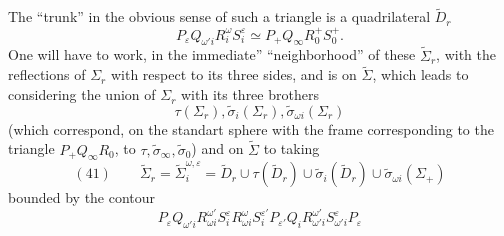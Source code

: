 The ``trunk''  in the obvious sense of such a triangle is a quadrilateral $\widetilde D_r$
\[
P_\varepsilon Q_{\omega'i}R_i^\omega S_i^\varepsilon\simeq P_+Q_\infty R_0^+S_0^+.
\]
One will have to work, in the immediate'' ``neighborhood'' of these    $\widetilde\Sigma_r$, with the reflections of $\Sigma_r$ with respect to its three sides, and is on $\widetilde\Sigma$,  which leads to considering the union of $\Sigma_r$ with its three brothers
\[
\tau(\Sigma_r),\widetilde\sigma_i(\Sigma_r),\widetilde\sigma_{\omega i}(\Sigma_r)
\]
(which  correspond, on the standart sphere with the frame corresponding to the triangle $P_+Q_\infty R_0$, to $\tau,\widetilde\sigma_\infty,\widetilde\sigma_0$) and on $\widetilde\Sigma$ to taking
\[
(41)\qquad\widetilde\Sigma_r=\widetilde\Sigma_i^{\omega,\varepsilon}=\widetilde D_r\cup\tau(\widetilde D_r)\cup\widetilde\sigma_i(\widetilde D_r)\cup\widetilde\sigma_{\omega i}(\Sigma_+)
\]
bounded by the contour
\[
P_\varepsilon Q_{\omega'i}R_{\omega i}^{\omega'}S_i^\varepsilon R_{\omega i}^{\omega}S_i^{\varepsilon'}P_{\varepsilon'}Q_iR_{\omega'i}^{\omega'}S_{\omega'i}^\varepsilon P_\varepsilon
\]
